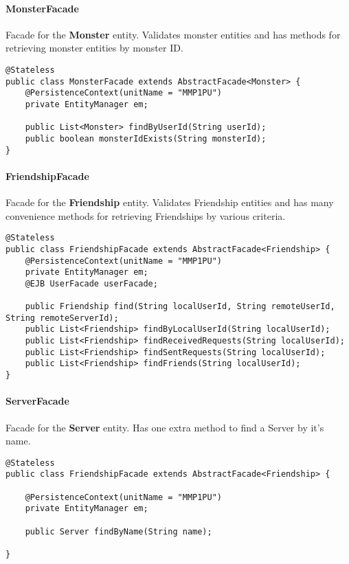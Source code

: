 \paragraph{MonsterFacade}
Facade for the \textbf{Monster} entity. Validates monster entities and has methods for retrieving monster entities by monster ID.
\begin{small}\begin{verbatim}
@Stateless
public class MonsterFacade extends AbstractFacade<Monster> {
    @PersistenceContext(unitName = "MMP1PU")
    private EntityManager em;

    public List<Monster> findByUserId(String userId);
    public boolean monsterIdExists(String monsterId);
}
\end{verbatim}\end{small}

\paragraph{FriendshipFacade}
Facade for the \textbf{Friendship} entity. Validates Friendship entities and has many convenience methods for retrieving Friendships by various criteria.
\begin{small}\begin{verbatim}
@Stateless
public class FriendshipFacade extends AbstractFacade<Friendship> {
    @PersistenceContext(unitName = "MMP1PU")
    private EntityManager em;
    @EJB UserFacade userFacade;

	public Friendship find(String localUserId, String remoteUserId, String remoteServerId);
    public List<Friendship> findByLocalUserId(String localUserId);
    public List<Friendship> findReceivedRequests(String localUserId);
    public List<Friendship> findSentRequests(String localUserId);
    public List<Friendship> findFriends(String localUserId);    
}
\end{verbatim}\end{small}

\paragraph{ServerFacade}
Facade for the \textbf{Server} entity. Has one extra method to find a Server by it's name.
\begin{small}\begin{verbatim}
@Stateless
public class FriendshipFacade extends AbstractFacade<Friendship> {

    @PersistenceContext(unitName = "MMP1PU")
    private EntityManager em;
    
    public Server findByName(String name);
        
}
\end{verbatim}\end{small}

